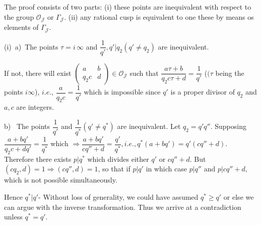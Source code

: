 The proof consists of two parts: (i) these points are inequivalent
with respect to the group $\mathscr{O}_\mathcal{J}$ or
$\Gamma_\mathcal{J}$. (ii) any rational cusp is equivalent to one
these by means os elements of $\Gamma_\mathcal{J}$. 

(i)~a)~\pageoriginale The points $\tau = i\, \infty$ and $\dfrac{1}{q'}, q'|q_2 (q'
\neq q_2)$ are inequivalent. 

If not, there will exist $\begin{pmatrix} a & b \\ q_2c &
  d \end{pmatrix} \in \mathscr{O}_\mathcal{J}$ such that $\dfrac{a
  \tau + b}{q_2 c \tau + d}= \dfrac{1}{q'}$ ($(\tau$ being the points
$i \infty$), $i.e$., $\dfrac {a}{q_2c}= \dfrac{1}{q'}$ which is
impossible since $q'$ is a proper divisor of $q_2$ and $a, c$ are
integers. 

b)~ The points $\dfrac{1}{q'}$ and $\dfrac{1}{q^*}(q' \neq q^*)$ are
inequivalent. Let $q_2 = q'q''$. Supposing $\dfrac{a+ bq'}{q_2 c+ dq'}
= \dfrac{1}{q^*}$ which $\Rightarrow \dfrac{a + bq'}{cq'' +d}=
\dfrac{q'}{q^*}, i.e., q^*(a+ bq') = q' (cq''+d)$. Therefore there
exists $p | q^*$ which divides either $q'$ or $cq'' +d$. But $(cq_2,
d) =1 \Rightarrow (cq'', d) = 1$, so that if $p|q'$ in which case
$p|q''$ and $p|cq'' + d$, which is not possible simultaneously. 

Hence $q^*|q'$- Without loss of generality, we could have assumed $q^*
\geq q'$ or else we can argue with the inverse transformation. 
Thus we arrive at a contradiction unless $q^* = q'$. 

